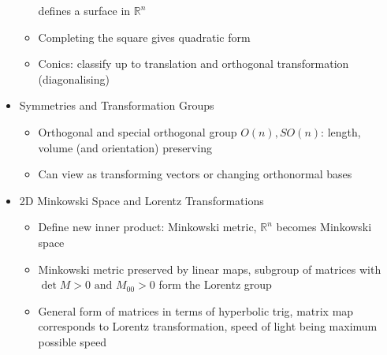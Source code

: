 \begin{itemize}
\begin{itemize}
                        defines a surface in $\mathbb{R}^{n}$
                  \item Completing the square gives quadratic form
                  \item Conics: classify up to translation and orthogonal transformation (diagonalising)
            \end{itemize}
      \item Symmetries and Transformation Groups
            \begin{itemize}
                  \item Orthogonal and special orthogonal group $O(n),SO(n)$: length, volume
                        (and orientation) preserving
                  \item Can view as transforming vectors or changing orthonormal bases
            \end{itemize}
      \item 2D Minkowski Space and Lorentz Transformations
            \begin{itemize}
                  \item Define new inner product: Minkowski metric, $\mathbb{R}^{n}$ becomes
                        Minkowski space
                  \item Minkowski metric preserved by linear maps, subgroup of matrices with
                        $\det M>0\textrm{ and }M_{00}>0$ form the Lorentz group
                  \item General form of matrices in terms of hyperbolic trig, matrix map corresponds
                        to Lorentz transformation, speed of light being maximum possible speed
            \end{itemize}
\end{itemize}


